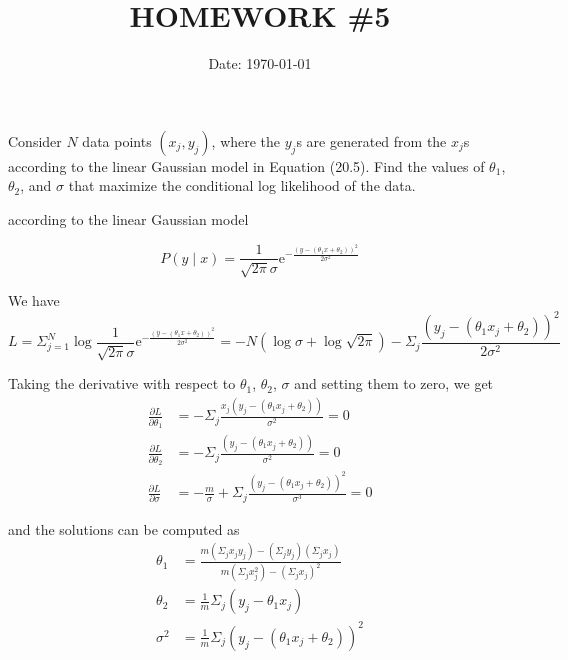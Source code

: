 \documentclass[cn,12pt]{homework}
\title{HOMEWORK \#5} %
\date{Date: \today} %
\institute{ZHEJIANG UNIVERSITY\quad COLLEGE OF INFORMATION SCIENCE AND ELECTRONICS ENGINEERING} %
\begin{document}
\maketitle



\begin{problem}
Consider $N$ data points $(x_j, y_j)$, 
where the $y_j$s are generated from the $x_j$s according to the 
linear Gaussian model in Equation (20.5). Find the values of $\theta_1$, 
$\theta_2$, and $\sigma$ that maximize the conditional log likelihood of the data.


\end{problem}


\begin{solution}
\quad
according to the linear Gaussian model

\begin{equation*}
P(y \mid x) = \frac{1}{\sqrt{2\pi}\sigma} \mathrm{e}^{-\frac{(y - (\theta_1 x + \theta_2))^2}{2\sigma^2}}
\end{equation*}

We have
\begin{equation*}
L = \Sigma_{j=1}^{N} \log \frac{1}{\sqrt{2\pi}\sigma} \mathrm{e}^{-\frac{(y - (\theta_1 x + \theta_2))^2}{2\sigma^2}}=-N(\log \sigma + \log \sqrt{2\pi}) - \Sigma_j \frac{(y_j - (\theta_1 x_j + \theta_2))^2}{2\sigma^2}
\end{equation*}

Taking the derivative with respect to $\theta_1$, $\theta_2$, $\sigma$ and setting them to zero, we get
\begin{align*}
\frac{\partial L}{\partial \theta_1} &= -\Sigma_j \frac{x_j(y_j - (\theta_1 x_j + \theta_2))}{\sigma^2} = 0 \\
\frac{\partial L}{\partial \theta_2} &= -\Sigma_j \frac{(y_j - (\theta_1 x_j + \theta_2))}{\sigma^2} = 0 \\
\frac{\partial L}{\partial \sigma} &= -\frac{m}{\sigma} + \Sigma_j \frac{(y_j - (\theta_1 x_j + \theta_2))^2}{\sigma^3} = 0
\end{align*}

and the solutions can be computed as
\begin{align*}
\theta_1 &= \frac{m \left( \Sigma_j x_j y_j \right) - \left( \Sigma_j y_j \right) \left( \Sigma_j x_j \right)}{m \left( \Sigma_j x_j^2 \right) - \left( \Sigma_j x_j \right)^2} \\
\theta_2 &= \frac{1}{m} \Sigma_j (y_j - \theta_1 x_j) \\
\sigma^2 &= \frac{1}{m} \Sigma_j (y_j - (\theta_1 x_j + \theta_2))^2
\end{align*}


\end{solution}
\newpage
\end{document}
